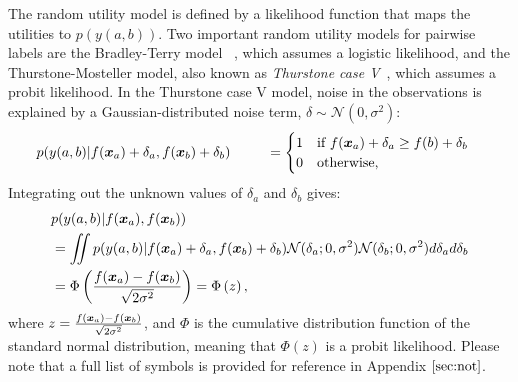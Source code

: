 The random utility model is defined by a likelihood function that
maps the utilities to $p(y(a,b))$.
Two important random utility models for pairwise labels are the Bradley-Terry model ~\citep{bradley1952rank,plackett1975analysis,luce1959possible},
which assumes a logistic likelihood,
and the Thurstone-Mosteller model, also known as \emph{Thurstone case V}~\citep{thurstone1927law,mosteller2006remarks}, which assumes a probit likelihood.
In the Thurstone case V model, 
noise in the observations is explained by a Gaussian-distributed noise term, $\delta \sim \mathcal{N}(0, \sigma^2)$:
\begin{align}
 p(y(a, b) | f(\boldsymbol x_a) + \delta_{a}, f(\boldsymbol x_b) + \delta_{b} )  
 \hspace{0.9cm} & = \begin{cases}
 1 & \text{if }f(\boldsymbol x_a) + \delta_{a} \geq f(b) + \delta_{b} \\
 0 & \text{otherwise,}
 \end{cases} &
 \label{eq:thurstone}
\end{align}
Integrating out the unknown values of $\delta_a$ and $\delta_b$ gives:
\begin{align}
& p( y(a, b) | f(\boldsymbol x_a), f(\boldsymbol x_b) )  \nonumber\\
& = \int\!\!\!\! \int p( y(a, b) | f(\boldsymbol x_a) + \delta_{a}, f(\boldsymbol x_b) + \delta_{b} ) \mathcal{N}(\delta_{a}; 0, \sigma^2)\mathcal{N}(\delta_{b}; 0, \sigma^2) d\delta_{a} d\delta_{b} \nonumber\\
& = \Phi\left(\frac{f(\boldsymbol x_a) - f(\boldsymbol x_b)}{\sqrt{2\sigma^2}}\right) = \Phi\left( z \right), 
\label{eq:plphi}
\end{align}
where $z = \frac{f(\boldsymbol x_a) - f(\boldsymbol x_b)}{\sqrt{2\sigma^2}}$,
and $\Phi$ is the cumulative distribution function of the standard normal distribution,
meaning that $\Phi(z)$ is a probit likelihood. 
Please note that a full list of symbols is provided for reference in Appendix $\ref{sec:not}$.

